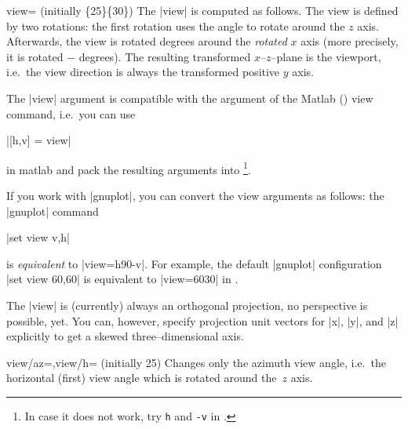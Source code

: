 {\begin{pgfplotskey}{view= (initially \{25\}\{30\})}
	The |view| is computed as follows. The view is defined by two rotations: the first rotation uses the  angle to rotate around the $z$ axis. Afterwards, the view is rotated  degrees around the \emph{rotated} $x$ axis (more precisely, it is rotated $-$ degrees). The resulting transformed $x$--$z$--plane is the viewport, i.e.\ the view direction is always the transformed positive $y$ axis.

	The |view| argument is compatible with the argument of the Matlab (\textregistered) view command, i.e.\ you can use 
	
	|[h,v] = view|
	
	\noindent in matlab and pack the resulting arguments into \PGFPlots\footnote{In case it does not work, try \texttt{h} and \texttt{-v} in \PGFPlots.}.

	If you work with |gnuplot|, you can convert the view arguments as follows: the |gnuplot| command

	|set view v,h|

	\noindent is \emph{equivalent} to |view={h}{90-v}|. For example, the default |gnuplot| configuration |set view 60,60| is equivalent to |view={60}{30}| in \PGFPlots.

	The |view| is (currently) always an orthogonal projection, no perspective is possible, yet. You can, however, specify projection unit vectors for |x|, |y|, and |z| explicitly to get a skewed three--dimensional axis.
\end{pgfplotskey}

\begin{pgfplotskeylist}{view/az=,view/h= (initially 25)}
	Changes only the azimuth view angle, i.e.\ the horizontal (first) view angle which is rotated around the~$z$ axis.

\pgfplotsexpensiveexample
\begin{codeexample}[]
\end{codeexample}

\pgfplotsexpensiveexample
\begin{codeexample}[]
\end{codeexample}


\end{pgfplotskeylist}}
